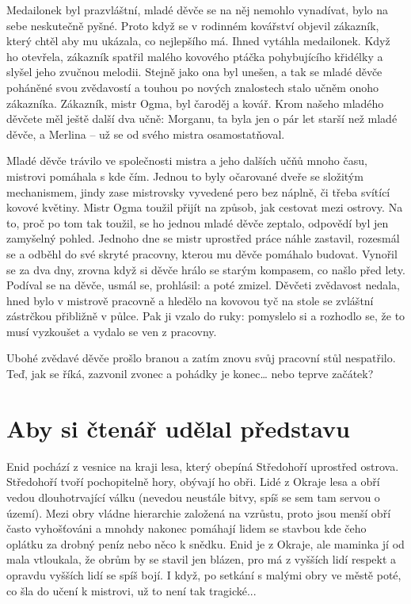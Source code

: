\documentclass[a4paper,twocolumn,openany,nodeprecatedcode, justified]{dndbook}
\begin{document}
	Medailonek byl prazvláštní, mladé děvče se na něj nemohlo vynadívat, bylo na sebe neskutečně pyšné. Proto když se v rodinném kovářství objevil zákazník, který chtěl aby mu ukázala, co nejlepšího má. Ihned vytáhla medailonek. Když ho otevřela, zákazník spatřil malého kovového ptáčka pohybujícího křidélky a slyšel jeho zvučnou melodii. Stejně jako ona byl unešen, a tak se mladé děvče poháněné svou zvědavostí a touhou po nových znalostech stalo učněm onoho zákazníka. Zákazník, mistr Ogma, byl čaroděj a kovář. Krom našeho mladého děvčete měl ještě další dva učně: Morganu, ta byla jen o pár let starší než mladé děvče, a Merlina -- už se od svého mistra osamostatňoval.
	
	Mladé děvče trávilo ve společnosti mistra a jeho dalších učňů mnoho času, mistrovi pomáhala s kde čím. Jednou to byly očarované dveře se složitým mechanismem, jindy zase mistrovsky vyvedené pero bez náplně, či třeba svítící kovové květiny. Mistr Ogma toužil přijít na způsob, jak cestovat mezi ostrovy. Na to, proč po tom tak toužil, se ho jednou mladé děvče zeptalo, odpovědí byl jen zamyšelný pohled. Jednoho dne se mistr uprostřed práce náhle zastavil, rozesmál se a odběhl do své skryté pracovny, kterou mu děvče pomáhalo budovat. Vynořil se za dva dny, zrovna když si děvče hrálo se starým kompasem, co našlo před lety. Podíval se na děvče, usmál se, prohlásil:  a poté zmizel. Děvčeti zvědavost nedala, hned bylo v mistrově pracovně a hledělo na kovovou tyč na stole se zvláštní zástrčkou přibližně v půlce. Pak ji vzalo do ruky:  pomyslelo si a rozhodlo se, že to musí vyzkoušet a vydalo se ven z pracovny.	
	
	Ubohé zvědavé děvče prošlo branou a zatím znovu svůj pracovní stůl nespatřilo. Teď, jak se říká, zazvonil zvonec a pohádky je konec… nebo teprve začátek?
	
	\section*{Aby si čtenář udělal představu}
	Enid pochází z vesnice na kraji lesa, který obepíná Středohoří uprostřed ostrova. Středohoří tvoří pochopitelně hory, obývají ho obři. Lidé z Okraje lesa a obří vedou dlouhotrvající válku (nevedou neustále bitvy, spíš se sem tam servou o území). Mezi obry vládne hierarchie založená na vzrůstu, proto jsou menší obří často vyhošťováni a mnohdy nakonec pomáhají lidem se stavbou kde čeho oplátku za drobný peníz nebo něco k snědku. Enid je z Okraje, ale maminka jí od mala vtloukala, že obrům by se stavil jen blázen, pro má z vyšších lidí respekt a opravdu vyšších lidí se spíš bojí. I když, po setkání s malými obry ve městě poté, co šla do učení k mistrovi, už to není tak tragické...
	
\end{document}
